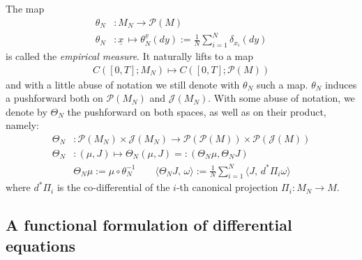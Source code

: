 \documentclass[reqno]{amsart}
\numberwithin{equation}{section}
\numberwithin{theorem}{section}
\newcommand{\mc}[1]{{\mathcal #1}}
\newcommand{\downbar}[1]{\underline{#1\!}\,}
\newcommand{\bel}[2]{\begin{equation} \label{#1} \begin{split} #2
 \end{split} \end{equation}}
\newcommand{\dangle}[2]{\langle #1,\,#2 \rangle}
\newcommand{\comment}[1]{
\par\noindent
\colorbox{light}{\begin{minipage}{120 mm}#1\end{minipage}}
\par\noindent
}
\newcommand{\undx}{\downbar{x}}
\begin{document}
The map
\bel{e:emp1}{
\theta_N & \colon M_N \to \mc P(M)
\\
\theta_N & \colon \undx \mapsto \theta_N^{\undx}(dy):=\tfrac 1N \sum_{i=1}^N \delta_{x_i}(dy)
}
is called the \emph{empirical measure}. It naturally lifts to a map
\bel{e:emp2}{
C([0,T];M_N) \mapsto C([0,T];\mc P(M))
}
and with a little abuse of notation we still denote with $\theta_N$ such a map. $\theta_N$ induces a pushforward both on $\mc P(M_N)$ and $\mc J(M_N)$. With some abuse of notation, we denote by $\Theta_N$ the pushforward on both spaces, as well as on their product, namely:
\bel{e:push1}{
\Theta_N & \colon \mc P(M_N) \times \mc J(M_N) \to \mc P(\mc P(M))\times \mc P(\mc J(M))
\\
\Theta_N & \colon (\mu,J)\mapsto \Theta_N(\mu,J)=:(\Theta_N\mu,\Theta_N J)
\\
& \Theta_N\mu:=\mu\circ \theta_N^{-1} \qquad \dangle{\Theta_N J}{\omega}:= \tfrac{1}{N}\sum_{i=1}^N \dangle{J}{d^\ast \Pi_i\omega}
}
where $d^\ast \Pi_i$ is the co-differential of the $i$-th canonical projection $\Pi_i\colon M_N\to M$.


\subsection{A functional formulation of differential equations}
\label{ss:2.3}
\end{document}
